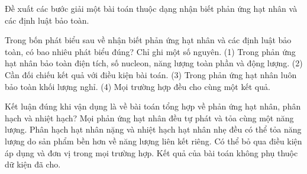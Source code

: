 \begin{bt}
Đề xuất các bước giải một bài toán thuộc dạng nhận biết phản ứng hạt nhân và các định luật bảo toàn.
\end{bt}

\begin{ex}
Trong bốn phát biểu sau về nhận biết phản ứng hạt nhân và các định luật bảo toàn, có bao nhiêu phát biểu đúng? Chỉ ghi một số nguyên. (1) Trong phản ứng hạt nhân bảo toàn điện tích, số nucleon, năng lượng toàn phần và động lượng. (2) Cần đối chiếu kết quả với điều kiện bài toán. (3) Trong phản ứng hạt nhân luôn bảo toàn khối lượng nghỉ. (4) Mọi trường hợp đều cho cùng một kết quả.
\end{ex}

\begin{ex}
Kết luận đúng khi vận dụng là về bài toán tổng hợp về phản ứng hạt nhân, phân hạch và nhiệt hạch?
\choice
{Mọi phản ứng hạt nhân đều tự phát và tỏa cùng một năng lượng.}
{\True Phân hạch hạt nhân nặng và nhiệt hạch hạt nhân nhẹ đều có thể tỏa năng lượng do sản phẩm bền hơn về năng lượng liên kết riêng.}
{Có thể bỏ qua điều kiện áp dụng và đơn vị trong mọi trường hợp.}
{Kết quả của bài toán không phụ thuộc dữ kiện đã cho.}
\end{ex}

